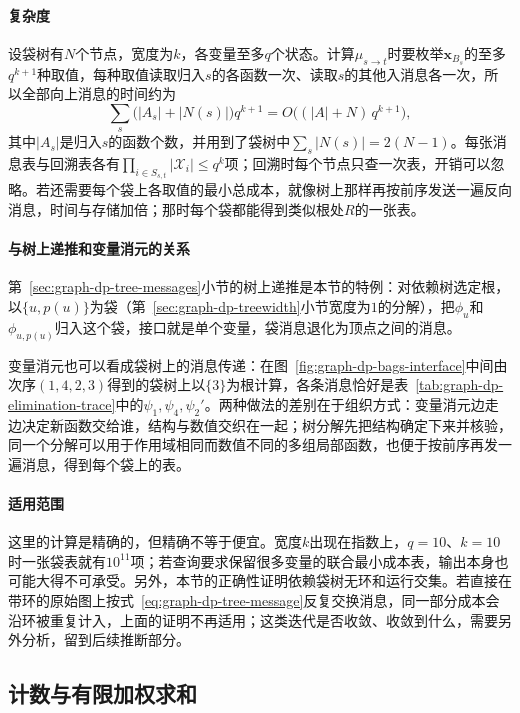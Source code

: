 \paragraph{复杂度}
设袋树有$N$个节点，宽度为$k$，各变量至多$q$个状态。计算$\mu_{s\to t}$时要枚举$\bm x_{B_s}$的至多$q^{k+1}$种取值，每种取值读取归入$s$的各函数一次、读取$s$的其他入消息各一次，所以全部向上消息的时间约为
\[
\sum_{s}\bigl(|A_s|+|N(s)|\bigr)q^{k+1}=O\bigl((|A|+N)\,q^{k+1}\bigr),
\]
其中$|A_s|$是归入$s$的函数个数，并用到了袋树中$\sum_s|N(s)|=2(N-1)$。每张消息表与回溯表各有$\prod_{i\in S_{s,t}}|\mathcal X_i|\leq q^{k}$项；回溯时每个节点只查一次表，开销可以忽略。若还需要每个袋上各取值的最小总成本，就像树上那样再按前序发送一遍反向消息，时间与存储加倍；那时每个袋都能得到类似根处$R$的一张表。

\paragraph{与树上递推和变量消元的关系}
第~\ref{sec:graph-dp-tree-messages}小节的树上递推是本节的特例：对依赖树选定根，以$\{u,p(u)\}$为袋（第~\ref{sec:graph-dp-treewidth}小节宽度为$1$的分解），把$\phi_u$和$\phi_{u,p(u)}$归入这个袋，接口就是单个变量，袋消息退化为顶点之间的消息。

变量消元也可以看成袋树上的消息传递：在图~\ref{fig:graph-dp-bags-interface}中间由次序$(1,4,2,3)$得到的袋树上以$\{3\}$为根计算，各条消息恰好是表~\ref{tab:graph-dp-elimination-trace}中的$\psi_1,\psi_4,\psi_2'$。两种做法的差别在于组织方式：变量消元边走边决定新函数交给谁，结构与数值交织在一起；树分解先把结构确定下来并核验，同一个分解可以用于作用域相同而数值不同的多组局部函数，也便于按前序再发一遍消息，得到每个袋上的表。

\paragraph{适用范围}
这里的计算是精确的，但精确不等于便宜。宽度$k$出现在指数上，$q=10$、$k=10$时一张袋表就有$10^{11}$项；若查询要求保留很多变量的联合最小成本表，输出本身也可能大得不可承受。另外，本节的正确性证明依赖袋树无环和运行交集。若直接在带环的原始图上按式~\eqref{eq:graph-dp-tree-message}反复交换消息，同一部分成本会沿环被重复计入，上面的证明不再适用；这类迭代是否收敛、收敛到什么，需要另外分析，留到后续推断部分。

\subsection{计数与有限加权求和}
\label{sec:graph-dp-semiring}

